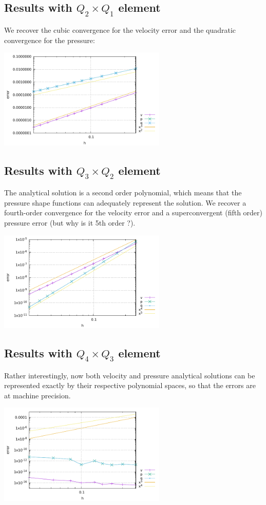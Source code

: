 \subsection*{Results with $Q_2\times Q_1$ element}

We recover the cubic convergence for the velocity error and the quadratic convergence 
for the pressure:

\begin{center}
\includegraphics[width=8cm]{python_codes/fieldstone_48/images/errors2.pdf}
\end{center}

\subsection*{Results with $Q_3\times Q_2$ element}

The analytical solution is a second order polynomial, which means that the pressure 
shape functions can adequately represent the solution. We recover a fourth-order 
convergence for the velocity error and a superconvergent (fifth order) pressure error 
(but why is it 5th order ?).

\begin{center}
\includegraphics[width=8cm]{python_codes/fieldstone_48/images/errors3.pdf}
\end{center}

\subsection*{Results with $Q_4\times Q_3$ element}

Rather interestingly, now both velocity and pressure analytical solutions 
can be represented exactly by their respective polynomial spaces, so that 
the errors are at machine precision.

\begin{center}
\includegraphics[width=8cm]{python_codes/fieldstone_48/images/errors4.pdf}
\end{center}



